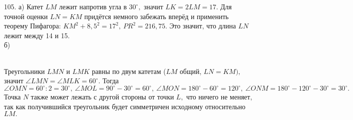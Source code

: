 105. а) Катет $LM$ лежит напротив угла в $30^\circ,$ значит $LK=2LM=17.$ Для точной оценки $LN=KM$ придётся немного забежать вперёд и применить теорему Пифагора: $KM^2+8,5^2=17^2,\ PR^2=216,75.$ Это значит, что длина $LN$ лежит между 14 и 15.\\
б)\begin{figure}[ht!]
\end{figure}\\
Треугольники $LMN$ и $LMK$ равны по двум катетам ($LM$ общий, $LN=KM),$ значит $\angle LMN=\angle MLK=60^\circ.$ Тогда $\angle OMN=60^\circ:2=30^\circ,\ \angle MOL=90^\circ-30^\circ=60^\circ,\ \angle MON=180^\circ-60^\circ=120^\circ,\ \angle ONM=180^\circ-120^\circ-30^\circ=30^\circ.$ Точка $N$ также может лежать с другой стороны от точки $L,$ что ничего не меняет, так как получившийся треугольник будет симметричен исходному относительно $LM.$\\
